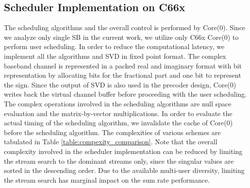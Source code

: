 \documentclass[conference,letterpaper]{./../../IEEE/IEEEtran}
\begin{document}
\subsection{Scheduler Implementation on C66x}
The scheduling algorithms and the overall control is performed by Core(0). Since we analyze only single SB in the current work, we utilize only C66x Core(0) to perform user scheduling. In order to reduce the computational latency, we implement all the algorithms and SVD in fixed point format. The complex baseband channel is represented in a packed real and imaginary format with  bit representation by allocating  bits for the fractional part and one bit to represent the sign. Since the output of SVD is also used in the precoder design, Core(0) writes back the virtual channel buffer before proceeding with the user scheduling. The complex operations involved in the scheduling algorithms are null space evaluation and the matrix-by-vector multiplications. In order to evaluate the actual timing of the scheduling algorithm, we invalidate the cache of Core(0) before the scheduling algorithm. The complexities of various schemes are tabulated in Table \ref{table:compexity_comparison}. Note that the overall complexity involved in the scheduler implementation can be reduced by limiting the stream search to the dominant streams only, since the singular values are sorted in the descending order. Due to the available multi-user diversity, limiting the stream search has marginal impact on the sum rate performance. 
\end{document}

